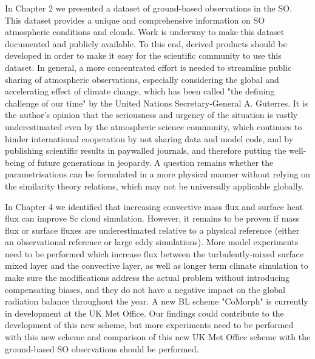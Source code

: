 In Chapter 2 we presented a dataset of ground-based observations in the SO.
This dataset provides a unique and comprehensive information on SO atmospheric
conditions and clouds. Work is underway to make this dataset documented and
publicly available. To this end, derived products should be developed in order
to make it easy for the scientific community to use this dataset. In general,
a more concentrated effort is needed to streamline public sharing of atmospheric
observations, especially considering the global and accelerating
effect of climate change, which has been called
"the defining challenge of our time" \citep{wmo2019} by the United Nations
Secretary-General A. Guterres. It is the author's opinion that the
seriousness and urgency of the situation is vastly underestimated even
by the atmospheric science community, which continues to hinder international
cooperation by not sharing data and model code, and by publishing scientific
results in paywalled journals, and therefore putting the well-being of future
generations in jeopardy. A question remains whether the parametrisations
can be formulated in a more physical manner without relying on the similarity
theory relations, which may not be universally applicable globally.

In Chapter 4 we identified that increasing convective mass flux and surface
heat flux can improve Sc cloud simulation. However, it remains
to be proven if mass flux or surface fluxes are underestimated relative to
a physical reference (either an observational reference or large eddy
simulations). More model experiments need to be performed which increase
flux between the turbulently-mixed surface mixed layer and the convective layer,
as well as longer term climate simulation to make sure the modifications
address the actual problem without introducing compensating biases,
and they do not have a negative impact on the
global radiation balance throughout the year. A new BL scheme "CoMorph"
is currently in development at the UK Met Office. Our findings could contribute
to the development of this new scheme, but more experiments need to be performed
with this new scheme and comparison of this new UK Met Office scheme with the ground-based
SO observations should be performed.

\clearpage
